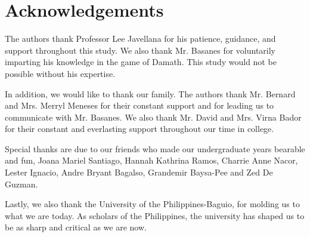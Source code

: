 \chapter*{Acknowledgements}

The authors thank Professor Lee Javellana for his patience, guidance, and support throughout this study.  We also thank Mr. Basanes for voluntarily imparting his knowledge in the game of Damath. This study would not be possible without his expertise.

In addition, we would like to thank our family. The authors thank Mr. Bernard and Mrs. Merryl Meneses for their constant support and for leading us to communicate with Mr. Basanes. We also thank Mr. David and Mrs. Virna Bador for their constant and everlasting support throughout our time in college.

Special thanks are due to our friends who made our undergraduate years bearable and fun, Joana Mariel Santiago, Hannah Kathrina Ramos, Charrie Anne Nacor, Lester Ignacio, Andre Bryant Bagalso, Grandemir Baysa-Pee and Zed De Guzman.



Lastly, we also thank the University of the Philippines-Baguio, for molding us to what we are today. As scholars of the Philippines, the university has shaped us to be as sharp and critical as we are now.




